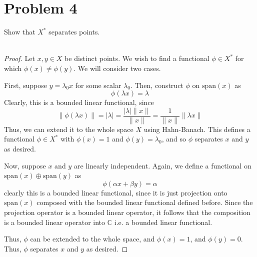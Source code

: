 \documentclass[fontsize=11pt]{scrartcl} %
\numberwithin{equation}{section} %
\numberwithin{figure}{section} %
\numberwithin{table}{section} %
\newcommand{\C}{\mathbb{C}}
\begin{document}
\newpage

\section*{Problem 4}
Show that $X^*$ separates points.
\\
\\
\begin{proof}
    Let $x,y\in X$ be distinct points. We wish to find a functional $\phi\in
    X^*$ for which $\phi(x)\neq \phi(y)$. We will consider two cases.
    
    First, suppose $y = \lambda_0 x$ for some scalar $\lambda_0$. Then, construct
    $\phi$ on $\text{span}(x)$ as
    \[
        \phi(\lambda x) = \lambda
    \]
    Clearly, this is a bounded linear functional, since 
    \[
        \|\phi(\lambda x)\| =
    |\lambda| = \frac{|\lambda|\|x\|}{\|x\|} = \frac{1}{\|x\|}\|\lambda x\|
\]
    Thus, we can extend it to the whole space $X$ using Hahn-Banach. This
    defines a functional $\phi\in X^*$ with $\phi(x) = 1$ and $\phi(y) =
    \lambda_0$, and so $\phi$ separates $x$ and $y$ as desired.

    Now, suppose $x$ and $y$ are linearly independent. Again, we define a
    functional on $\text{span}(x)\oplus\text{span}(y)$ as 
    \[
        \phi(\alpha x + \beta y) = \alpha
    \]
    clearly this is a bounded linear functional, since it is just projection
    onto $\text{span}(x)$ composed with the bounded linear functional defined
    before. Since the projection operator is a bounded linear operator, it
    follows that the composition is a bounded linear operator into $\C$ i.e. a
    bounded linear functional.

    Thus, $\phi$ can be extended to the whole space, and $\phi(x) = 1$, and
    $\phi(y) = 0$. Thus, $\phi$ separates $x$ and $y$ as desired.
\end{proof}
\end{document}
